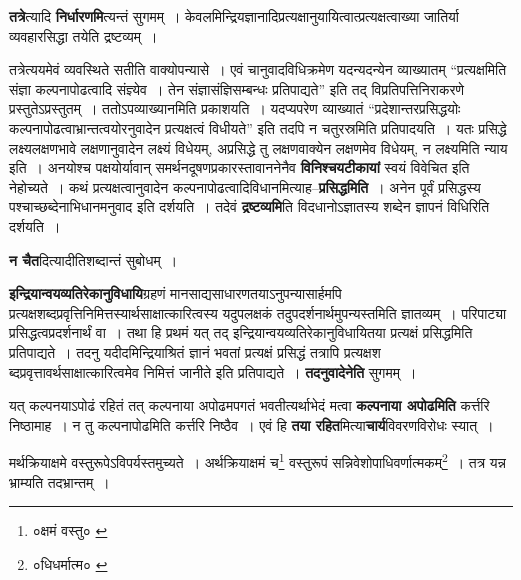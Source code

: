 \documentclass[article,12pt,a4paper]{memoir}
\begin{document}
	  \pstart \textbf{तत्रे}त्यादि \textbf{निर्धारणमि}त्यन्तं सुगमम् । केवलमिन्द्रियज्ञानादिप्रत्यक्षानुयायित्वात्प्रत्यक्षत्वाख्या जातिर्या व्यवहारसिद्धा तयेति द्रष्टव्यम् ।
	\pend
      

	  \pstart तत्रेत्ययमेवं व्यवस्थिते सतीति वाक्योपन्यासे । एवं चानुवादविधिक्रमेण यदन्यदन्येन व्याख्यातम् “प्रत्यक्षमिति संज्ञा कल्पनापोढत्वादि संज्ञ्येव । तेन संज्ञासंज्ञिसम्बन्धः प्रतिपाद्यते” इति तद् विप्रतिपत्तिनिराकरणे प्रस्तुतेऽप्रस्तुतम् । ततोऽपव्याख्यानमिति प्रकाशयति । यदप्यपरेण व्याख्यातं “प्रदेशान्तरप्रसिद्धयोः कल्पनापोढत्वाभ्रान्तत्वयोरनुवादेन प्रत्यक्षत्वं विधीयते” इति तदपि न चतुरस्रमिति प्रतिपादयति । यतः प्रसिद्धे लक्ष्यलक्षणभावे लक्षणानुवादेन लक्ष्यं विधेयम्, अप्रसिद्धे तु लक्षणवाक्येन लक्षणमेव विधेयम्, न लक्ष्यमिति न्याय इति । अनयोश्च पक्षयोर्यावान् समर्थनदूषणप्रकारस्तावाननेनैव \textbf{विनिश्चयटीकायां} स्वयं विवेचित इति नेहोच्यते । कथं प्रत्यक्षत्वानुवादेन कल्पनापोढत्वादिविधानमित्याह--\textbf{प्रसिद्धमिति} । अनेन पूर्वं प्रसिद्धस्य पश्चाच्छब्देनाभिधानमनुवाद इति दर्शयति । तदेवं \textbf{द्रष्टव्यमि}ति विदधानोऽज्ञातस्य शब्देन ज्ञापनं विधिरिति दर्शयति ।
	\pend
      

	  \pstart \textbf{न चैत}दित्यादीतिशब्दान्तं सुबोधम् ।
	\pend
      

	  \pstart \textbf{इन्द्रियान्वयव्यतिरेकानुविधायि}ग्रहणं मानसाद्यसाधारणतयाऽनुपन्यासार्हमपि प्रत्यक्षशब्दप्रवृत्तिनिमित्तस्यार्थसाक्षात्कारित्वस्य यदुपलक्षकं तदुपदर्शनार्थमुपन्यस्तमिति ज्ञातव्यम् । परिपाट्या प्रसिद्धत्वप्रदर्शनार्थं वा । तथा हि प्रथमं यत् तद् इन्द्रियान्वयव्यतिरेकानुविधायितया प्रत्यक्षं प्रसिद्धमिति प्रतिपाद्यते । तदनु यदीदमिन्द्रियाश्रितं ज्ञानं भवतां प्रत्यक्षं प्रसिद्धं तत्रापि प्रत्यक्षश \leavevmode{}ब्दप्रवृत्तावर्थसाक्षात्कारित्वमेव निमित्तं जानीते इति प्रतिपाद्यते । \textbf{तदनुवादेनेति} सुगमम् ।
	\pend
      

	  \pstart यत् कल्पनयाऽपोढं रहितं तत् कल्पनाया अपोढमपगतं भवतीत्यर्थाभेदं मत्वा \textbf{कल्पनाया अपोढमिति} कर्त्तरि निष्ठामाह । न तु कल्पनापोढमिति कर्त्तरि निष्ठैव । एवं हि \textbf{तया रहित}मित्या\textbf{चार्य}विवरणविरोधः स्यात् ।
	\pend
	  \bigskip
	  \begingroup
	

	  \pstart मर्थक्रियाक्षमे वस्तुरूपेऽविपर्यस्तमुच्यते । अर्थक्रियाक्षमं च\footnote{०क्षमं वस्तु० \cite{dp-msA} \cite{dp-edP} \cite{dp-edE}} वस्तुरूपं सन्निवेशोपाधिवर्णात्मकम्\footnote{०धिधर्मात्म० \cite{dp-edP} \cite{dp-edH}} । तत्र यन्न भ्राम्यति तदभ्रान्तम् ।
	\pend
      
	  \endgroup
	
\end{document}
